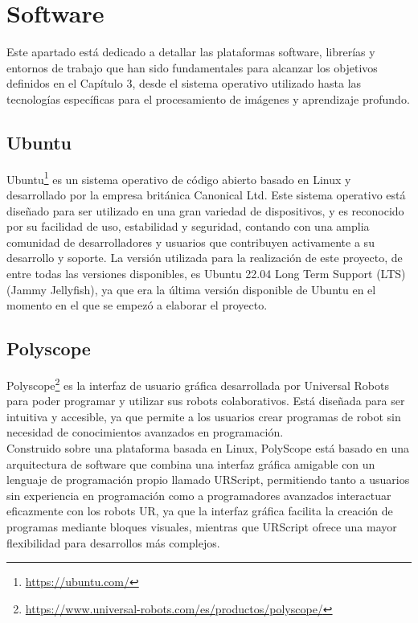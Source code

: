 \setcounter{footnote}{21} 

\section{Software}
\label{sec:software}

Este apartado está dedicado a detallar las plataformas software, librerías y entornos de trabajo que han sido fundamentales para alcanzar los objetivos definidos en el Capítulo 3, desde el sistema operativo utilizado hasta las tecnologías específicas para el procesamiento de imágenes y aprendizaje profundo.

\subsection{Ubuntu}
\label{sec:ubuntu}
Ubuntu\footnote{\url{https://ubuntu.com/}} es un sistema operativo de código abierto basado en Linux y desarrollado por la empresa británica Canonical Ltd. 
Este sistema operativo está diseñado para ser utilizado en una gran variedad de dispositivos, y es reconocido por su facilidad de uso, estabilidad y seguridad, contando con una amplia comunidad de desarrolladores y usuarios que contribuyen activamente a su desarrollo y soporte. La versión utilizada para la realización de este proyecto, de entre todas las versiones disponibles, es Ubuntu 22.04 Long Term Support (LTS) (Jammy Jellyfish), ya que era la última versión disponible de Ubuntu en el momento en el que se empezó a elaborar el proyecto. 

\subsection{Polyscope}
\label{sec:Polyscope}

Polyscope\footnote{\url{https://www.universal-robots.com/es/productos/polyscope/}} es la interfaz de usuario gráfica desarrollada por Universal Robots para poder programar y utilizar sus robots colaborativos. Está diseñada para ser intuitiva y accesible, ya que permite a los usuarios crear programas de robot sin necesidad de conocimientos avanzados en programación.\\

Construido sobre una plataforma basada en Linux, PolyScope está basado en una arquitectura de software que combina una interfaz gráfica amigable con un lenguaje de programación propio llamado URScript, permitiendo tanto a usuarios sin experiencia en programación como a programadores avanzados interactuar eficazmente con los robots UR, ya que la interfaz gráfica facilita la creación de programas mediante bloques visuales, mientras que URScript ofrece una mayor flexibilidad para desarrollos más complejos.\\

